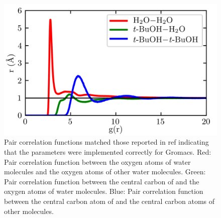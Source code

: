 \begin{figure}
    \center
    \includegraphics[width=\single]{figures-helix/rdfs.png}
    \caption[Pair correlation functions between solvent molecules in a binary mixture]{
        Pair correlation functions matched those reported in ref  indicating that the \tba{} parameters were implemented correctly for Gromacs. 
        Red: Pair correlation function between the oxygen atoms of water molecules and the oxygen atoms of other water molecules. 
        Green: Pair correlation function between the central carbon of \tba{} and the oxygen atoms of water molecules. 
        Blue: Pair correlation function between the central carbon atom of \tba{} and the central carbon atoms of other \tba{} molecules. 
    }
    \label{fig:helix-rdfs}
\end{figure}

